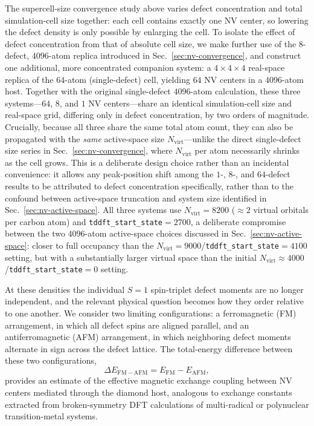 The supercell-size convergence study above varies defect concentration
and total simulation-cell size together: each cell contains exactly one
NV center, so lowering the defect density is only possible by enlarging
the cell. To isolate the effect of defect concentration from that of
absolute cell size, we make further use of the $8$-defect,
$4096$-atom replica introduced in Sec.~\ref{sec:nv-convergence}, and
construct one additional, more concentrated companion system: a
$4\times4\times4$ real-space replica of the $64$-atom (single-defect)
cell, yielding $64$ NV centers in a $4096$-atom host. Together with the
original single-defect $4096$-atom calculation, these three
systems---$64$, $8$, and $1$ NV centers---share an identical
simulation-cell size and real-space grid, differing only in defect
concentration, by two orders of magnitude. Crucially, because all three
share the same total atom count, they can also be propagated with the
\emph{same} active-space size $N_{\mathrm{virt}}$---unlike the direct
single-defect size series in Sec.~\ref{sec:nv-convergence}, where
$N_{\mathrm{virt}}$ per atom necessarily shrinks as the cell grows.
This is a deliberate design choice rather than an incidental
convenience: it allows any peak-position shift among the $1$-, $8$-,
and $64$-defect results to be attributed to defect concentration
specifically, rather than to the confound between active-space
truncation and system size identified in
Sec.~\ref{sec:nv-active-space}. All three systems use
$N_{\mathrm{virt}}=8200$ ($\approx\!2$ virtual orbitals per carbon
atom) and \texttt{tddft\_start\_state}$=2700$, a deliberate compromise
between the two $4096$-atom active-space choices discussed in
Sec.~\ref{sec:nv-active-space}: closer to full occupancy than the
$N_{\mathrm{virt}}=9000$/\texttt{tddft\_start\_state}$=4100$ setting,
but with a substantially larger virtual space than the initial
$N_{\mathrm{virt}}\approx\!4000$/\texttt{tddft\_start\_state}$=0$
setting.

At these densities the individual $S=1$ spin-triplet defect moments are
no longer independent, and the relevant physical question becomes how
they order relative to one another. We consider two limiting
configurations: a ferromagnetic (FM) arrangement, in which all defect
spins are aligned parallel, and an antiferromagnetic (AFM) arrangement,
in which neighboring defect moments alternate in sign across the defect
lattice. The total-energy difference between these two configurations,
\begin{equation}
  \Delta E_{\mathrm{FM-AFM}} = E_{\mathrm{FM}} - E_{\mathrm{AFM}},
\end{equation}
provides an estimate of the effective magnetic exchange coupling between
NV centers mediated through the diamond host, analogous to exchange
constants extracted from broken-symmetry DFT calculations of
multi-radical or polynuclear transition-metal
systems.

